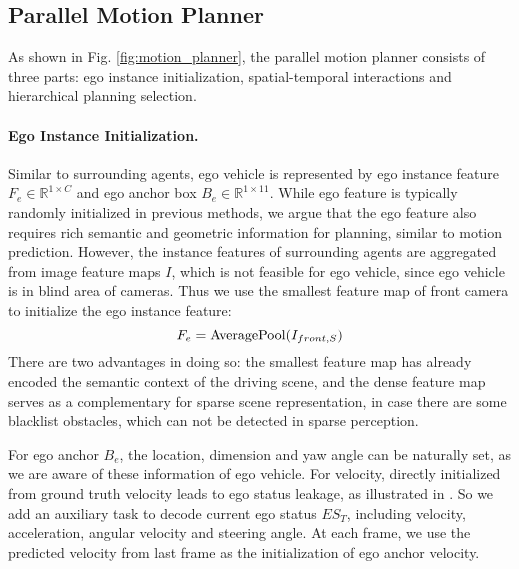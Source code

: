 \subsection{Parallel Motion Planner}
As shown in Fig. \ref{fig:motion_planner}, the parallel motion planner consists of three parts: ego instance initialization, spatial-temporal interactions and hierarchical planning selection.

\paragraph{Ego Instance Initialization.}
Similar to surrounding agents, ego vehicle is represented by ego instance feature $F_e \in \mathbb{R}^{1 \times C}$  and ego anchor box $B_e \in \mathbb{R}^{1 \times 11}$. While ego feature is typically randomly initialized in previous methods, we argue that the ego feature also requires rich semantic and geometric information for planning, similar to motion prediction. However, the instance features of surrounding agents are aggregated from image feature maps $I$, which is not feasible for ego vehicle, since ego vehicle is in blind area of cameras. Thus we use the smallest feature map of front camera to initialize the ego instance feature: 
\begin{equation}
F_e = {\rm AveragePool}(I_{front,S})
\end{equation}
There are two advantages in doing so: the smallest feature map has already encoded the semantic context of the driving scene, and the dense feature map serves as a complementary for sparse scene representation, in case there are some blacklist obstacles, which can not be detected in sparse perception.

For ego anchor $B_e$, the location, dimension and yaw angle can be naturally set, as we are aware of these information of ego vehicle. For velocity, directly initialized from ground truth velocity leads to ego status leakage, as illustrated in \cite{ego}. So we add an auxiliary task to decode current ego status $ES_T$, including velocity, acceleration, angular velocity and steering angle. At each frame, we use the predicted velocity from last frame as the initialization of ego anchor velocity.



